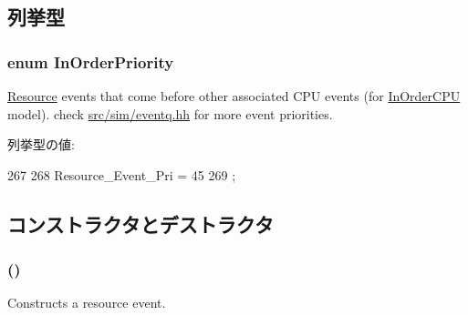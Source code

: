 \subsection{列挙型}
\hypertarget{classResourceEvent_adbb7cf3320b352f9d5ac0d9d551b1d51}{
\subsubsection[{InOrderPriority}]{\setlength{\rightskip}{0pt plus 5cm}enum {\bf InOrderPriority}}}
\label{classResourceEvent_adbb7cf3320b352f9d5ac0d9d551b1d51}
\hyperlink{classResource}{Resource} events that come before other associated CPU events (for \hyperlink{classInOrderCPU}{InOrderCPU} model). check \hyperlink{eventq_8hh}{src/sim/eventq.hh} for more event priorities. \begin{Desc}
\item[列挙型の値: ]\par
\begin{description}
\item[{\em 
\hypertarget{classResourceEvent_adbb7cf3320b352f9d5ac0d9d551b1d51a2799452f4eb3f1d208cfc92786e7fbdf}{
Resource\_\-Event\_\-Pri}
\label{classResourceEvent_adbb7cf3320b352f9d5ac0d9d551b1d51a2799452f4eb3f1d208cfc92786e7fbdf}
}]\end{description}
\end{Desc}




\begin{DoxyCode}
267                          {
268         Resource_Event_Pri = 45
269     };
\end{DoxyCode}


\subsection{コンストラクタとデストラクタ}
\hypertarget{classResourceEvent_a587b69e246a088ece211c6945b11ecd4}{
\subsubsection[{ResourceEvent}]{ ()}}
\label{classResourceEvent_a587b69e246a088ece211c6945b11ecd4}
Constructs a resource event. 


